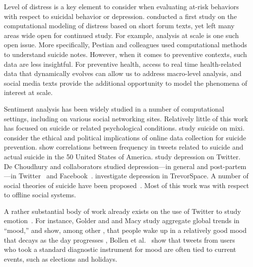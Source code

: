 \documentclass[11pt]{article}
\begin{document}
Level of distress is a key element to consider when evaluating at-risk behaviors with respect to suicidal behavior or depression.  conducted a first study on the computational modeling of distress based on short forum texts, yet left many areas wide open for continued study. For example, analysis at scale is one such open issue. More specifically, Pestian and colleagues \cite{pestinaetal2009,pestinaetal2008} used computational methods to understand suicide notes. However, when it comes to preventive contexts, such data are less insightful. For preventive health, access to real time health-related data that dynamically evolves can allow us to address macro-level analysis, and social media texts provide the additional opportunity to model the phenomena of interest at scale.

Sentiment analysis has been widely studied in a number of computational settings, including on various social networking sites. Relatively little of this work has focused on suicide or related psychological conditions.  study suicide on mixi.  consider the ethical and political implications of online data collection for suicide prevention.  show correlations between frequency in tweets related to suicide and actual suicide in the 50 United States of America.  study depression on Twitter. De Choudhury and collaborators studied depression---in general and post-partem---in Twitter~\cite{de2012not,de2012happy,de2013major,de2013understanding} and Facebook~\cite{de2014characterizing}.  investigate depression in TrevorSpace. A number of social theories of suicide have been proposed~\cite{wray2011sociology}. Most of this work was with respect to offline social systems. 

A rather substantial body of work already exists on the use of Twitter to study emotion~\cite{bollen2011twitter,dodds2011temporal,wang2012harnessing,pfitzner2012emotional,kim2012you,bollen2011happiness,pfitzner2012emotional,bollen2011modeling,mohammad2012emotional,golder2011diurnal,de2012not,de2012happy,de2013major,de2013understanding,hannak2012tweetin,thelwall2011sentiment,pak2010twitter}. For instance,
Golder and and Macy study aggregate global trends in ``mood,'' and show, among other , that people wake up in a relatively good mood that decays as the day progresses \cite{golder2011diurnal}, Bollen et al.~\cite{bollen2011modeling} show that tweets from users who took a standard diagnostic instrument for mood are often tied to current events, such as elections and holidays.
\end{document}
